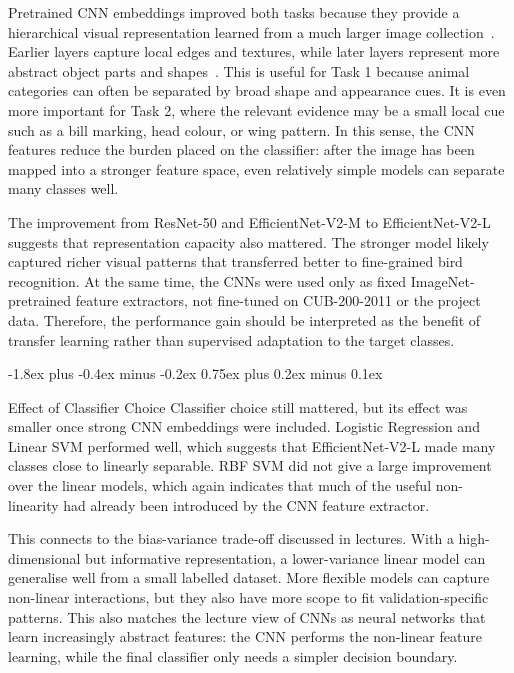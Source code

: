 \documentclass[11pt]{article}
\makeatletter
\renewcommand\subsection{%
    \@startsection{subsection}{2}{\z@}%
                  {-1.8ex plus -0.4ex minus -0.2ex}%
                  {0.75ex plus 0.2ex minus 0.1ex}%
                  {\normalsize\bf\raggedright}}
\makeatother
\begin{document}
Pretrained CNN embeddings improved both tasks because they provide a hierarchical
visual representation learned from a much larger image collection~\cite{deng2009imagenet,yosinski2014transferable}. 
Earlier layers capture local edges and textures, while later layers represent more 
abstract object parts and shapes~\cite{zeiler2014visualizing}. This is useful for 
Task 1 because animal categories can often be separated by broad shape and appearance 
cues. It is even more important for Task 2, where the relevant evidence may be a small 
local cue such as a bill marking, head colour, or wing pattern. In this sense, the CNN 
features reduce the burden placed on the classifier: after the image has been mapped 
into a stronger feature space, even relatively simple models can separate many classes well.

The improvement from ResNet-50 and EfficientNet-V2-M to EfficientNet-V2-L
suggests that representation capacity also mattered. The stronger model likely
captured richer visual patterns that transferred better to fine-grained bird
recognition. At the same time, the CNNs were used only as fixed ImageNet-pretrained feature extractors,
not fine-tuned on CUB-200-2011 or the project data. Therefore, the performance gain
should be interpreted as the benefit of transfer learning rather than supervised
adaptation to the target classes.

\subsection{Effect of Classifier Choice}
Classifier choice still mattered, but its effect was smaller once strong CNN
embeddings were included. Logistic Regression and Linear SVM performed well,
which suggests that EfficientNet-V2-L made many classes close to linearly
separable. RBF SVM did not give a large improvement over the linear models, which
again indicates that much of the useful non-linearity had already been introduced
by the CNN feature extractor.

This connects to the bias-variance trade-off discussed in lectures. With a
high-dimensional but informative representation, a lower-variance linear model can
generalise well from a small labelled dataset. More flexible models can capture
non-linear interactions, but they also have more scope to fit validation-specific
patterns. This also matches the lecture view of CNNs as neural networks that learn
increasingly abstract features: the CNN performs the non-linear feature learning,
while the final classifier only needs a simpler decision boundary.
\end{document}
